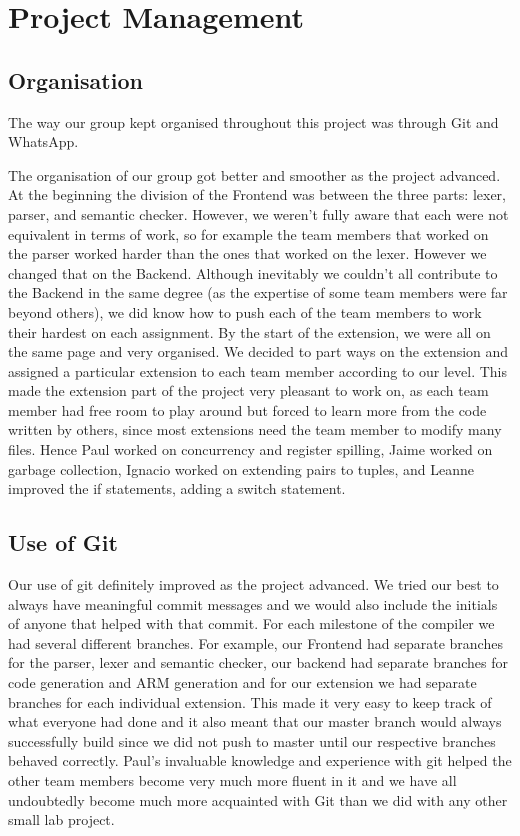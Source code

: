 \documentclass{article}
\begin{document}
\section{Project Management}

\subsection{Organisation}
The way our group kept organised throughout this project was through Git and WhatsApp. 

The organisation of our group got better and smoother as the project advanced. At the beginning the division of the Frontend was between the three parts: lexer, 
parser, and semantic checker. However, we weren't fully aware that each were not equivalent in terms of work, so for example the team members that worked on the parser worked harder than the ones that worked on the lexer. However we changed that on the Backend. Although inevitably we couldn't all contribute to the Backend in the same degree (as the expertise of some team members were far beyond others), we did know how to push each of the team members to work their hardest on each assignment. By the start of the extension, we were all on the same page and very organised. We decided to part ways on the extension and assigned a particular extension to each team member according to our level. This made the extension part of the project very pleasant to work on, as each team member had 
free room to play around but forced to learn more from the code written by others, since most extensions need the team member to modify many files. Hence Paul worked on concurrency and register spilling, Jaime worked on garbage collection, Ignacio worked on extending pairs to tuples, and Leanne improved the if statements, adding a switch statement. 

\subsection{Use of Git}
Our use of git definitely improved as the project advanced. We tried our best to always have meaningful commit messages and we would also include the initials of anyone that helped with that commit. For each milestone of the compiler we had several different branches. For example, our Frontend had separate branches for the parser, lexer and semantic checker, our backend had separate branches for code generation and ARM generation and for our extension we had separate branches for each individual extension. This made it very easy to keep track of what everyone had done and it also meant that our master branch would always successfully build since we did not push to master until our respective branches behaved correctly. Paul's invaluable knowledge and experience with git helped the other team members become very much more fluent in it and we have all undoubtedly become much more acquainted with Git than we did with any other small lab project.
\end{document}
